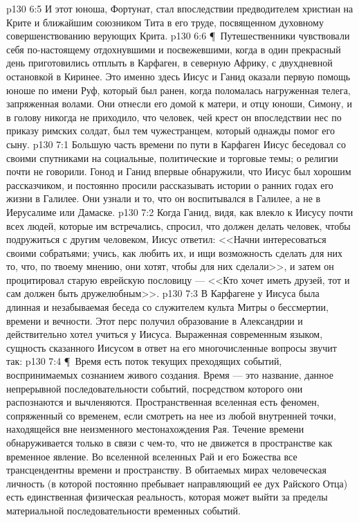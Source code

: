 \vs p130 6:5 И этот юноша, Фортунат, стал впоследствии предводителем христиан на Крите и ближайшим союзником Тита в его труде, посвященном духовному совершенствованию верующих Крита.
\vs p130 6:6 \P\ Путешественники чувствовали себя по\hyp{}настоящему отдохнувшими и посвежевшими, когда в один прекрасный день приготовились отплыть в Карфаген, в северную Африку, с двухдневной остановкой в Киринее. Это именно здесь Иисус и Ганид оказали первую помощь юноше по имени Руф, который был ранен, когда поломалась нагруженная телега, запряженная волами. Они отнесли его домой к матери, и отцу юноши, Симону, и в голову никогда не приходило, что человек, чей крест он впоследствии нес по приказу римских солдат, был тем чужестранцем, который однажды помог его сыну.
\vs p130 7:1 Большую часть времени по пути в Карфаген Иисус беседовал со своими спутниками на социальные, политические и торговые темы; о религии почти не говорили. Гонод и Ганид впервые обнаружили, что Иисус был хорошим рассказчиком, и постоянно просили рассказывать истории о ранних годах его жизни в Галилее. Они узнали и то, что он воспитывался в Галилее, а не в Иерусалиме или Дамаске.
\vs p130 7:2 Когда Ганид, видя, как влекло к Иисусу почти всех людей, которые им встречались, спросил, что должен делать человек, чтобы подружиться с другим человеком, Иисус ответил: <<Начни интересоваться своими собратьями; учись, как любить их, и ищи возможность сделать для них то, что, по твоему мнению, они хотят, чтобы для них сделали>>, и затем он процитировал старую еврейскую пословицу --- <<Кто хочет иметь друзей, тот и сам должен быть дружелюбным>>.
\vs p130 7:3 В Карфагене у Иисуса была длинная и незабываемая беседа со служителем культа Митры о бессмертии, времени и вечности. Этот перс получил образование в Александрии и действительно хотел учиться у Иисуса. Выраженная современным языком, сущность сказанного Иисусом в ответ на его многочисленные вопросы звучит так:
\vs p130 7:4 \P\ Время есть поток текущих преходящих событий, воспринимаемых сознанием живого создания. Время --- это название, данное непрерывной последовательности событий, посредством которого они распознаются и вычленяются. Пространственная вселенная есть феномен, сопряженный со временем, если смотреть на нее из любой внутренней точки, находящейся вне неизменного местонахождения Рая. Течение времени обнаруживается только в связи с чем\hyp{}то, что не движется в пространстве как временное явление. Во вселенной вселенных Рай и его Божества все трансцендентны времени и пространству. В обитаемых мирах человеческая личность (в которой постоянно пребывает направляющий ее дух Райского Отца) есть единственная физическая реальность, которая может выйти за пределы материальной последовательности временных событий.
